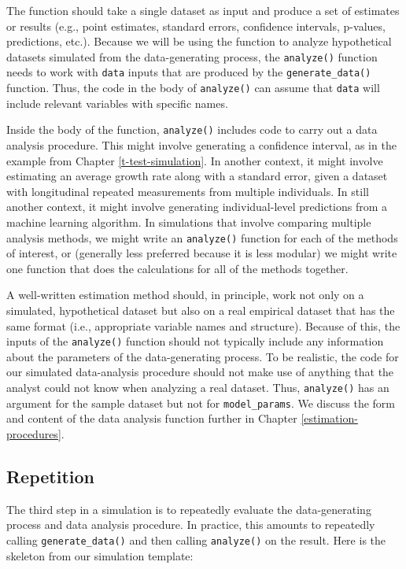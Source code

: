 \documentclass[
]{book}
\begin{document}
The function should take a single dataset as input and produce a set of estimates or results (e.g., point estimates, standard errors, confidence intervals, p-values, predictions, etc.).
Because we will be using the function to analyze hypothetical datasets simulated from the data-generating process, the \texttt{analyze()} function needs to work with \texttt{data} inputs that are produced by the \texttt{generate\_data()} function.
Thus, the code in the body of \texttt{analyze()} can assume that \texttt{data} will include relevant variables with specific names.

Inside the body of the function, \texttt{analyze()} includes code to carry out a data analysis procedure.
This might involve generating a confidence interval, as in the example from Chapter \ref{t-test-simulation}.
In another context, it might involve estimating an average growth rate along with a standard error, given a dataset with longitudinal repeated measurements from multiple individuals.
In still another context, it might involve generating individual-level predictions from a machine learning algorithm.
In simulations that involve comparing multiple analysis methods, we might write an \texttt{analyze()} function for each of the methods of interest, or (generally less preferred because it is less modular) we might write one function that does the calculations for all of the methods together.

A well-written estimation method should, in principle, work not only on a simulated, hypothetical dataset but also on a real empirical dataset that has the same format (i.e., appropriate variable names and structure).
Because of this, the inputs of the \texttt{analyze()} function should not typically include any information about the parameters of the data-generating process.
To be realistic, the code for our simulated data-analysis procedure should not make use of anything that the analyst could not know when analyzing a real dataset.
Thus, \texttt{analyze()} has an argument for the sample dataset but not for \texttt{model\_params}.
We discuss the form and content of the data analysis function further in Chapter \ref{estimation-procedures}.

\subsection{Repetition}\label{repetition}

The third step in a simulation is to repeatedly evaluate the data-generating process and data analysis procedure.
In practice, this amounts to repeatedly calling \texttt{generate\_data()} and then calling \texttt{analyze()} on the result.
Here is the skeleton from our simulation template:
\end{document}
